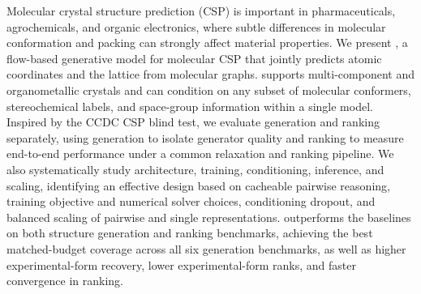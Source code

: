 Molecular crystal structure prediction (CSP) is important in pharmaceuticals, agrochemicals, and organic electronics, where subtle differences in molecular conformation and packing can strongly affect material properties. We present \model{}, a flow-based generative model for molecular CSP that jointly predicts atomic coordinates and the lattice from molecular graphs. \model{} supports multi-component and organometallic crystals and can condition on any subset of molecular conformers, stereochemical labels, and space-group information within a single model. Inspired by the CCDC CSP blind test, we evaluate generation and ranking separately, using generation to isolate generator quality and ranking to measure end-to-end performance under a common relaxation and ranking pipeline. We also systematically study architecture, training, conditioning, inference, and scaling, identifying an effective design based on cacheable pairwise reasoning, training objective and numerical solver choices, conditioning dropout, and balanced scaling of pairwise and single representations. \model{} outperforms the baselines on both structure generation and ranking benchmarks, achieving the best matched-budget coverage across all six generation benchmarks, as well as higher experimental-form recovery, lower experimental-form ranks, and faster convergence in ranking.
